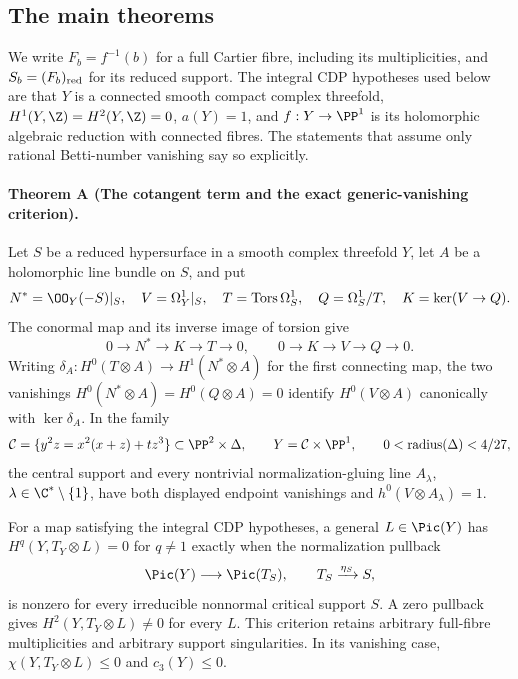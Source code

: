 
\subsection{The main theorems}
\label{series:II:main-theorems}

We write $F_b=f^{-1}(b)$ for a full Cartier fibre, including its
multiplicities, and $S_b=(F_b)_{\rm red}$ for its reduced support.
The integral CDP hypotheses used below are that $Y$ is a connected
smooth compact complex threefold, $H^1(Y,\Z)=H^2(Y,\Z)=0$,
$a(Y)=1$, and $f:Y\to\PP^1$ is its holomorphic algebraic reduction
with connected fibres. The statements that assume only rational
Betti-number vanishing say so explicitly.

\hypertarget{main-II-A}{}
\paragraph{Theorem A (The cotangent term and the exact generic-vanishing criterion).}
\label{series:II:A}
Let $S$ be a reduced hypersurface in a smooth complex threefold $Y$,
let $A$ be a holomorphic line bundle on $S$, and put
\[
 N^*=\OO_Y(-S)|_S,\quad V=\Omega_Y^1|_S,\quad
 T=\operatorname{Tors}\Omega_S^1,\quad Q=\Omega_S^1/T,
 \quad K=\ker(V\to Q).
\]
The conormal map and its inverse image of torsion give
\[
 0\to N^*\to K\to T\to0,
 \qquad 0\to K\to V\to Q\to0.
\]
Writing $\delta_A:H^0(T\otimes A)\to H^1(N^*\otimes A)$
for the first connecting map, the two vanishings
$H^0(N^*\otimes A)=H^0(Q\otimes A)=0$ identify
$H^0(V\otimes A)$ canonically with $\ker\delta_A$.
In the family
\[
 \mathcal C=\{y^2z=x^2(x+z)+tz^3\}\subset\PP^2\times\Delta,
 \qquad Y=\mathcal C\times\PP^1,
 \qquad 0<\operatorname{radius}(\Delta)<4/27,
\]
the central support and every nontrivial normalization-gluing line
$A_\lambda$, $\lambda\in\C^*\setminus\{1\}$, have both displayed
endpoint vanishings and $h^0(V\otimes A_\lambda)=1$.

For a map satisfying the integral CDP hypotheses, a general
$L\in\Pic(Y)$ has $H^q(Y,T_Y\otimes L)=0$ for $q\ne1$
exactly when the normalization pullback
\[
 \Pic(Y)\longrightarrow\Pic(T_S),\qquad
 T_S\xrightarrow{\eta_S}S,
\]
is nonzero for every irreducible nonnormal critical support $S$.
A zero pullback gives $H^2(Y,T_Y\otimes L)\ne0$ for every $L$.
This criterion retains arbitrary full-fibre multiplicities and
arbitrary support singularities. In its vanishing case,
$\chi(Y,T_Y\otimes L)\le0$ and $c_3(Y)\le0$.

